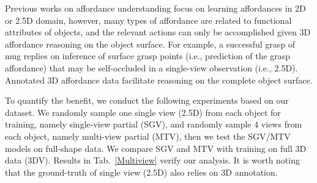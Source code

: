 \documentclass[final]{cvpr}
\begin{document}
\begin{table}[!htb]
\caption{The comparisons between 3D and 2.5D. P and D refer to PointNet++ and DGCNN respectively.
}
\label{Multiview}
\vspace{-0.3cm}
\end{table}

Previous works on affordance understanding focus on learning affordances in 2D or 2.5D domain, however, many types of affordance are related to functional attributes of objects, and the relevant actions can only be accomplished given 3D affordance reasoning on the object surface. For example, a successful grasp of mug replies on inference of surface grasp points (i.e., prediction of the grasp affordance) that may be self-occluded in a single-view observation (i.e., 2.5D). Annotated 3D affordance data facilitate reasoning on the complete object surface.

To quantify the benefit, we conduct the following experiments based on our dataset. We randomly sample one single view (2.5D) from each object for training, namely single-view partial (SGV), and randomly sample 4 views from each object, namely multi-view partial (MTV), then we test the SGV/MTV models on full-shape data. We compare SGV and MTV with training on full 3D data (3DV). Results in Tab.~\ref{Multiview} verify our analysis. It is worth noting that the ground-truth of single view (2.5D) also relies on 3D annotation.
\end{document}

